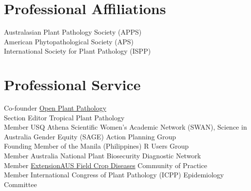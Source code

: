 
\section*{Professional Affiliations}
  Australasian Plant Pathology Society (APPS)\\[3 mm]
  American Phytopathological Society (APS)\\[3 mm]
  International Society for Plant Pathology (ISPP)\\

\section*{Professional Service}
  Co-founder \href{https://www.openplantpathology.org}{Open Plant Pathology}\\[3 mm]
  Section Editor Tropical Plant Pathology\\[3 mm]
  Member USQ Athena Scientific Women’s Academic Network (SWAN), Science in Australia Gender Equity (SAGE) Action Planning Group\\[3 mm]
  Founding Member of the Manila (Philippines) R Users Group\\[3 mm]
  Member Australia National Plant Biosecurity Diagnostic Network\\[3 mm]
  Member \href{http://extensionaus.com.au/field-crop-diseases/}{ExtensionAUS Field Crop Diseases} Community of Practice\\[3 mm]
  Member International Congress of Plant Pathology (ICPP) Epidemiology Committee\\
